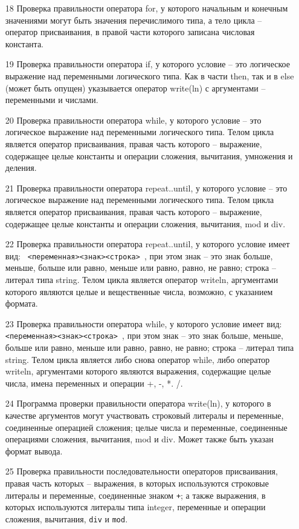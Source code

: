 \begin{enumerate}
\item[18] Проверка правильности оператора for, у которого начальным и конечным значениями могут быть
значения перечислимого типа, а тело цикла -- оператор присваивания, в правой части которого записана
числовая константа.

\item[19] Проверка правильности оператора if, у которого условие -- это логическое выражение над
переменными логического типа. Как в части then, так и в else (может быть опущен) указывается
оператор write(ln) с аргументами -- переменными и числами.

\item[20] Проверка правильности оператора while, у которого условие -- это логическое выражение над
переменными логического типа. Телом цикла является оператор присваивания, правая часть которого -- выражение, содержащее
целые константы и операции сложения, вычитания, умножения и деления.


\item[21] Проверка правильности оператора repeat..until, у которого условие -- это логическое выражение над
переменными логического типа. Телом цикла является оператор присваивания, правая часть которого -- выражение, содержащее
целые константы и операции сложения, вычитания, mod и div.

\item[22] Проверка правильности оператора repeat..until,
у которого условие имеет вид: \verb| <переменная><знак><строка> |,
при этом знак -- это знак больше, меньше, больше или равно, меньше или равно, равно, не равно; строка -- литерал типа
string. Телом цикла является оператор writeln, аргументами которого являются
целые и вещественные числа, возможно, с указанием формата.

\item[23] Проверка правильности оператора while, у которого условие имеет вид: \verb| <переменная><знак><строка> |,
при этом знак -- это знак больше, меньше, больше или равно, меньше или равно, равно, не равно; строка -- литерал
типа string. Телом цикла является либо снова оператор while, либо оператор writeln, аргументами которого являются
выражения, содержащие целые числа, имена переменных и операции +, -, *. /.

\item[24] Программа проверки правильности оператора write(ln), у которого в качестве аргументов могут участвовать
строковый литералы и переменные, соединенные операцией сложения; целые числа и переменные, соединенные операциями сложения, вычитания,
mod  и div. Может также быть указан формат вывода.

\item[25] Проверка правильности последовательности операторов присваивания, правая часть которых -- выражения,
в которых используются строковые литералы и переменные, соединенные знаком \verb|+|; а также выражения, в
которых используются литералы типа integer, переменные и операции сложения, вычитания, \verb|div| и \verb|mod|.
\end{enumerate}

